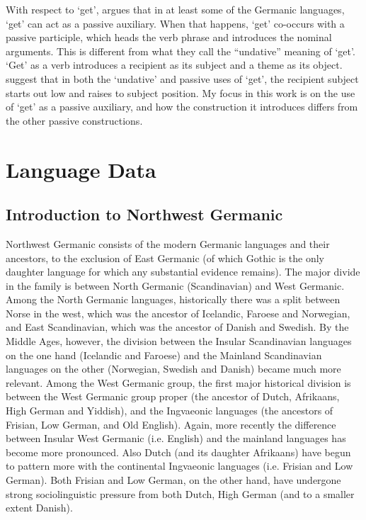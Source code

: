 With respect to `get', \cite{Broekhuis.1994} argues that in at least some of the Germanic languages, `get' can act as a passive auxiliary. When that happens, `get' co-occurs with a passive participle, which heads the verb phrase and introduces the nominal arguments. This is different from what they call the ``undative'' meaning of `get'. `Get' as a verb introduces a recipient as its subject and a theme as its object. \cite{Broekhuis.1994} suggest that in both the `undative' and passive uses of `get', the recipient subject starts out low and raises to subject position. My focus in this work is on the use of `get' as a passive auxiliary, and how the construction it introduces differs from the other passive constructions.

\part{Language Data}\label{part:langg}
\chapter{Introduction to Northwest Germanic}
Northwest Germanic consists of the modern Germanic languages and their ancestors, to the exclusion of East Germanic (of which Gothic is the only daughter language for which any substantial evidence remains). The major divide in the family is between North Germanic (Scandinavian) and West Germanic. Among the North Germanic languages, historically there was a split between Norse in the west, which was the ancestor of Icelandic, Faroese and Norwegian, and East Scandinavian, which was the ancestor of Danish and Swedish. By the Middle Ages, however, the division between the Insular Scandinavian languages on the one hand (Icelandic and Faroese) and the Mainland Scandinavian languages on the other (Norwegian, Swedish and Danish) became much more relevant. Among the West Germanic group, the first major historical division is between the West Germanic group proper (the ancestor of Dutch, Afrikaans, High German and Yiddish), and the Ingvaeonic languages (the ancestors of Frisian, Low German, and Old English). Again, more recently the difference between Insular West Germanic (i.e. English) and the mainland languages has become more pronounced. Also Dutch (and its daughter Afrikaans) have begun to pattern more with the continental Ingvaeonic languages (i.e. Frisian and Low German). Both Frisian and Low German, on the other hand, have undergone strong sociolinguistic pressure from both Dutch, High German (and to a smaller extent Danish).

